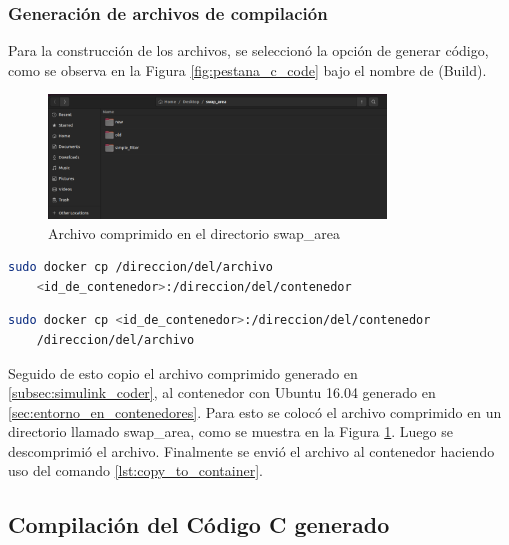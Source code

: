 \subsubsection{Generación de archivos de compilación}

Para la construcción de los archivos, se seleccionó la opción de generar código, como se observa en la Figura \ref{fig:pestana_c_code} bajo el nombre de (Build).

\begin{figure}[h!]
    \centering
    \includegraphics[width=0.8\textwidth]{fig/especifico_2/M2MT/paso_a_paso_mtmt/root_folder.pdf}
    \caption{Archivo comprimido en el directorio swap\_area}
    \label{fig:pestana_swap_area}
\end{figure}

\begin{lstlisting}[language=bash, caption={Copiar archivos al contenedor, Linux}, label=lst:copy_to_container]
    sudo docker cp /direccion/del/archivo 
    <id_de_contenedor>:/direccion/del/contenedor
\end{lstlisting}

\begin{lstlisting}[language=bash, caption={Copiar archivos del contenedor, Linux}, label=lst:copy_from_container]
    sudo docker cp <id_de_contenedor>:/direccion/del/contenedor
    /direccion/del/archivo
\end{lstlisting}

Seguido de esto copio el archivo comprimido generado en \ref{subsec:simulink_coder}, al contenedor con Ubuntu 16.04 generado en \ref{sec:entorno_en_contenedores}. Para esto se colocó el archivo comprimido en un directorio llamado swap\_area, como se muestra en la Figura \ref{fig:pestana_swap_area}. Luego se descomprimió el archivo. Finalmente se envió el archivo al contenedor haciendo uso del comando \ref{lst:copy_to_container}.


\subsection{Compilación del Código C generado}\label{subsec:compilacion_binario}

